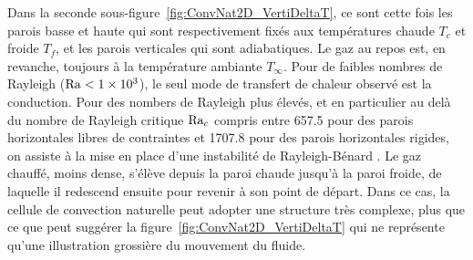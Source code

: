 Dans la seconde sous-figure~\ref{fig:ConvNat2D_VertiDeltaT}, ce sont cette fois les parois basse et haute qui sont respectivement fixés aux températures chaude $T_c$ et froide $T_f$, et les parois verticales qui sont adiabatiques. Le gaz au repos est, en revanche, toujours à la température ambiante $T_\infty$. Pour de faibles nombres de Rayleigh ($\mathrm{Ra}<\num{1e3}$), le seul mode de transfert de chaleur observé est la conduction. Pour des nombers de Rayleigh plus élevés, et en particulier au delà du nombre de Rayleigh critique $\mathrm{Ra}_c$ compris entre \num{657.5} pour des parois horizontales libres de contraintes et \num{1707.8} pour des parois horizontales rigides, on assiste à la mise en place d'une instabilité de Rayleigh-Bénard \cite{getling_rayleigh-benard_1998}. Le gaz chauffé, moins dense, s'élève depuis la paroi chaude jusqu'à la paroi froide, de laquelle il redescend ensuite pour revenir à son point de départ. Dans ce cas, la cellule de convection naturelle peut adopter une structure très complexe, plus que ce que peut suggérer la figure~\ref{fig:ConvNat2D_VertiDeltaT} qui ne représente qu'une illustration grossière du mouvement du fluide.%

%    


